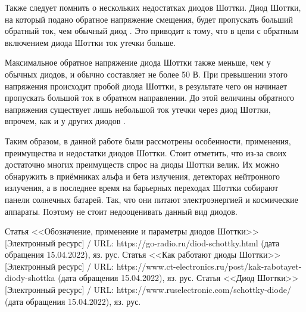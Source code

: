 \documentclass[spec, och, referat]{shiza}
\begin{document}
Также следует помнить о нескольких недостатках диодов Шоттки. Диод Шоттки, на который подано обратное напряжение смещения, будет пропускать больший 
обратный ток, чем обычный диод \cite{3}. Это приводит к тому, что в цепи с обратным включением диода Шоттки ток утечки больше.
 

Максимальное обратное напряжение диода Шоттки также меньше, чем у обычных диодов, и обычно составляет не более 50 В. При превышении этого напряжения 
происходит пробой диода Шоттки, в результате чего он начинает пропускать большой ток в обратном направлении. До этой величины обратного напряжения существует
лишь небольшой ток утечки через диод Шоттки, впрочем, как и у других диодов \cite{3}.


\conclusion

Таким образом, в данной работе были рассмотрены особенности, применения, преимущества и недостатки диодов Шоттки. Стоит отметить, что из-за своих достаточно
многих преимуществ спрос на диоды Шоттки велик. Их можно обнаружить в приёмниках альфа и бета излучения, детекторах нейтронного излучения, 
а в последнее время на барьерных переходах Шоттки собирают панели солнечных батарей. Так, что они питают электроэнергией и космические аппараты. Поэтому не стоит
недооценивать данный вид диодов.


\begin{thebibliography}{3}
  Статья <<Обозначение, применение и параметры диодов Шоттки>> [Электронный ресурс] / URL: https://go-radio.ru/diod-schottky.html (дата обращения 15.04.2022), яз. рус.
  Статья <<Как работают диоды Шоттки>> [Электронный ресурс] / URL: https://www.ct-electronics.ru/post/kak-rabotayet-diody-shottka (дата обращения 15.04.2022), яз. рус.
  Статья <<Диод Шоттки>> [Электронный ресурс] / URL: https://www.ruselectronic.com/schottky-diode/ (дата обращения 15.04.2022), яз. рус.
\end{thebibliography}
\end{document}
